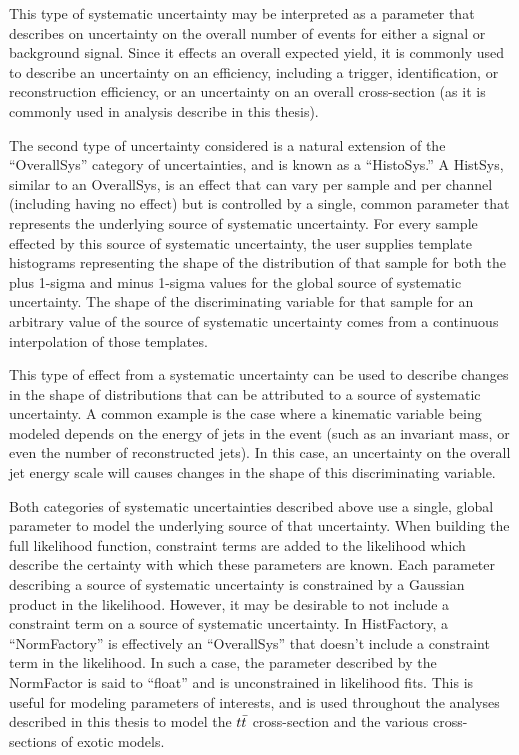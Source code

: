 This type of systematic uncertainty may be interpreted as a parameter that describes on uncertainty on the overall number of events for either a signal or background signal.
Since it effects an overall expected yield, it is commonly used to describe an uncertainty on an efficiency, including a trigger, identification, or reconstruction efficiency, or an uncertainty on an overall cross-section (as it is commonly used in analysis describe in this thesis).

The second type of uncertainty considered is a natural extension of the ``OverallSys'' category of uncertainties, and is known as a ``HistoSys.''
A HistSys, similar to an OverallSys, is an effect that can vary per sample and per channel (including having no effect) but is controlled by a single, common parameter
that represents the underlying source of systematic uncertainty.
For every sample effected by this source of systematic uncertainty, the user supplies template histograms representing the shape of the distribution of that sample for both the plus 1-sigma and minus 1-sigma values for the global source of systematic uncertainty.
The shape of the discriminating variable for that sample for an arbitrary value of the source of systematic uncertainty comes from a continuous interpolation of those templates.

This type of effect from a systematic uncertainty can be used to describe changes in the shape of distributions that can be attributed to a source of systematic uncertainty.
A common example is the case where a kinematic variable being modeled depends on the energy of jets in the event (such as an invariant mass, or even the number of reconstructed jets).
In this case, an uncertainty on the overall jet energy scale will causes changes in the shape of this discriminating variable.

Both categories of systematic uncertainties described above use a single, global parameter to model the underlying source of that uncertainty.
When building the full likelihood function, constraint terms are added to the likelihood which describe the certainty with which these parameters are known.
Each parameter describing a source of systematic uncertainty is constrained by a Gaussian product in the likelihood.
However, it may be desirable to not include a constraint term on a source of systematic uncertainty.
In HistFactory, a ``NormFactory'' is effectively an ``OverallSys'' that doesn't include a constraint term in the likelihood.
In such a case, the parameter described by the NormFactor is said to ``float'' and is unconstrained in likelihood fits.
This is useful for modeling parameters of interests, and is used throughout the analyses described in this thesis to model the $t\bar{t}$ cross-section and the various cross-sections of exotic models.

